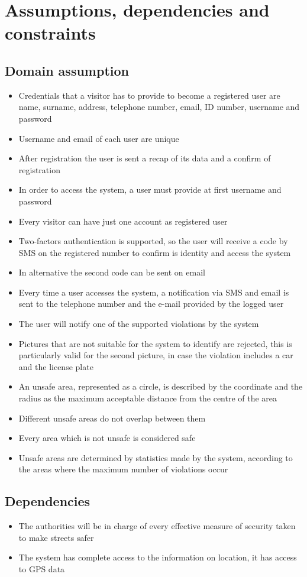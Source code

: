 \section{Assumptions, dependencies and constraints}

\subsection{Domain assumption}
  \begin{itemize}
    \item Credentials that a visitor has to provide to become a registered user are name, surname, address, telephone number, email, ID number, username and password
    \item Username and email of each user are unique
    \item After registration the user is sent a recap of its data and a confirm of registration
    \item In order to access the system, a user must provide at first username and password
    \item Every visitor can have just one account as registered user
    \item Two-factors authentication is supported, so the user will receive a code by SMS on the registered number to confirm is identity and access the system
    \item In alternative the second code can be sent on email
    \item Every time a user accesses the system, a notification via SMS and email is sent to the telephone number and the e-mail provided by the logged user
    \item The user will notify one of the supported violations by the system
    \item Pictures that are not suitable for the system to identify are rejected, this is particularly valid for the second picture, in case the violation includes a car and the license plate 
    \item An unsafe area, represented as a circle, is described by the coordinate and the radius as the maximum acceptable distance from the centre of the area
    \item Different unsafe areas do not overlap between them
    \item Every area which is not unsafe is considered safe
    \item Unsafe areas are determined by statistics made by the system, according to the areas where the maximum number of violations occur 
  \end{itemize}

\subsection{Dependencies}
  \begin{itemize}
    \item The authorities will be in charge of every effective measure of security taken to make streets safer
    \item The system has complete access to the information on location, it has access to GPS data
  \end{itemize}
